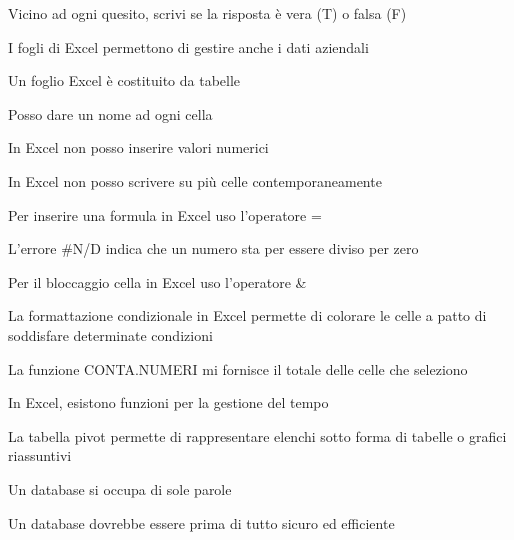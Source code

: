 \documentclass[addpoints]{exam}
\newcommand{\tf}[1][{}]{%
	\fillin[#1][0.25in]%
}
\begin{document}
 
\begin{center}
\end{center}

\vspace{5mm}

 
\vspace{10mm}

Vicino ad ogni quesito, scrivi se la risposta è vera (T) o falsa (F)
\begin{multicols}{2}
	
\begin{questions} 

\question[1] \tf[T] I fogli di Excel permettono di gestire anche i dati aziendali

\question[1] \tf[F] Un foglio Excel è costituito da tabelle

\question[1] \tf[T] Posso dare un nome ad ogni cella

\question[1] \tf[F] In Excel non posso inserire valori numerici

\question[1] \tf[F] In Excel non posso scrivere su più celle contemporaneamente

\question[1] \tf[T] Per inserire una formula in Excel uso l'operatore =

\question[1] \tf[F] L'errore \#N/D indica che un numero sta per essere diviso per zero

\question[1] \tf[F] Per il bloccaggio cella in Excel uso l'operatore \&

\question[1] \tf[T] La formattazione condizionale in Excel permette di colorare le celle a patto di soddisfare determinate condizioni

\question[1] \tf[F] La funzione CONTA.NUMERI mi fornisce il totale delle celle che seleziono

\question[1] \tf[T] In Excel, esistono funzioni per la gestione del tempo

\question[1] \tf[T] La tabella pivot permette di rappresentare elenchi sotto forma di tabelle o grafici riassuntivi

\question[1] \tf[F] Un database si occupa di sole parole

\question[1] \tf[T] Un database dovrebbe essere prima di tutto sicuro ed efficiente


\end{questions}
\end{multicols}
\end{document}
